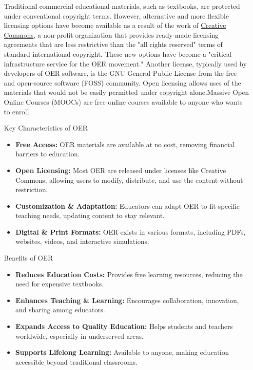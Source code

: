 \documentclass[a4paper,11pt]{article}
\begin{document}
Traditional commercial educational materials, such as textbooks, are protected under conventional copyright terms. However, alternative and more flexible licensing options have become available as a result of the work of \href{https://en.wikipedia.org/wiki/Creative_Commons}{Creative Commons}, a non-profit organization that provides ready-made licensing agreements that are less restrictive than the "all rights reserved" terms of standard international copyright. These new options have become a "critical infrastructure service for the OER movement." Another license, typically used by developers of OER software, is the GNU General Public License from the free and open-source software (FOSS) community. Open licensing allows uses of the materials that would not be easily permitted under copyright alone.Massive Open Online Courses (MOOCs) are free online courses available to anyone who wants to enroll.

{Key Characteristics of OER}
\begin{itemize}
	\item \textbf{Free Access:} OER materials are available at no cost, removing financial barriers to education.
	\item \textbf{Open Licensing:} Most OER are released under licenses like Creative Commons, allowing users to modify, distribute, and use the content without restriction.
	\item \textbf{Customization \& Adaptation:} Educators can adapt OER to fit specific teaching needs, updating content to stay relevant.
	\item \textbf{Digital \& Print Formats:} OER exists in various formats, including PDFs, websites, videos, and interactive simulations.
\end{itemize}

{Benefits of OER}
\begin{itemize}
	\item \textbf{Reduces Education Costs:} Provides free learning resources, reducing the need for expensive textbooks.
	\item \textbf{Enhances Teaching \& Learning:} Encourages collaboration, innovation, and sharing among educators.
	\item \textbf{Expands Access to Quality Education:} Helps students and teachers worldwide, especially in underserved areas.
	\item \textbf{Supports Lifelong Learning:} Available to anyone, making education accessible beyond traditional classrooms.
\end{itemize}
\end{document}
